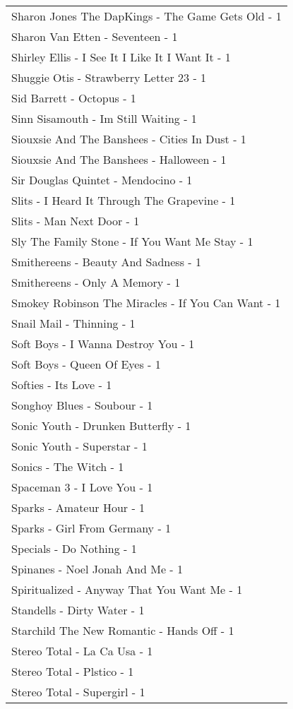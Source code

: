 \documentclass[
]{article}
\begin{document}
\begin{longtable}{l}
Sharon Jones The DapKings - The Game Gets Old - 1 \\ 
Sharon Van Etten - Seventeen - 1 \\ 
Shirley Ellis - I See It I Like It I Want It - 1 \\ 
Shuggie Otis - Strawberry Letter 23 - 1 \\ 
Sid Barrett - Octopus - 1 \\ 
Sinn Sisamouth - Im Still Waiting - 1 \\ 
Siouxsie And The Banshees - Cities In Dust - 1 \\ 
Siouxsie And The Banshees - Halloween - 1 \\ 
Sir Douglas Quintet - Mendocino - 1 \\ 
Slits - I Heard It Through The Grapevine - 1 \\ 
Slits - Man Next Door - 1 \\ 
Sly The Family Stone - If You Want Me Stay - 1 \\ 
Smithereens - Beauty And Sadness - 1 \\ 
Smithereens - Only A Memory - 1 \\ 
Smokey Robinson The Miracles - If You Can Want - 1 \\ 
Snail Mail - Thinning - 1 \\ 
Soft Boys - I Wanna Destroy You - 1 \\ 
Soft Boys - Queen Of Eyes - 1 \\ 
Softies - Its Love - 1 \\ 
Songhoy Blues - Soubour - 1 \\ 
Sonic Youth - Drunken Butterfly - 1 \\ 
Sonic Youth - Superstar - 1 \\ 
Sonics - The Witch - 1 \\ 
Spaceman 3 - I Love You - 1 \\ 
Sparks - Amateur Hour - 1 \\ 
Sparks - Girl From Germany - 1 \\ 
Specials - Do Nothing - 1 \\ 
Spinanes - Noel Jonah And Me - 1 \\ 
Spiritualized - Anyway That You Want Me - 1 \\ 
Standells - Dirty Water - 1 \\ 
Starchild The New Romantic - Hands Off - 1 \\ 
Stereo Total - La Ca Usa - 1 \\ 
Stereo Total - Plstico - 1 \\ 
Stereo Total - Supergirl - 1 \\ 

\end{longtable}
\end{document}
